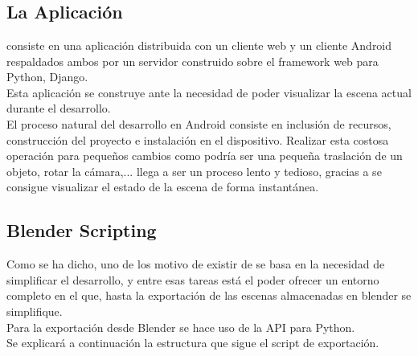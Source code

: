 
\chapter{\studio} %

\label{Chapter3} %



\section{La Aplicación \studio}
\studio consiste en una aplicación distribuida con un cliente web y un cliente Android respaldados ambos por un servidor construido sobre el framework web para Python, Django.\\
Esta aplicación se construye ante la necesidad de poder visualizar la escena actual durante el desarrollo.\\
El proceso natural del desarrollo en Android consiste en inclusión de recursos, construcción del proyecto e instalación en el dispositivo. Realizar esta costosa operación para pequeños cambios como podría ser una pequeña traslación de un objeto, rotar la cámara,... llega a ser un proceso lento y tedioso, gracias a \studio se consigue visualizar el estado de la escena de forma instantánea.

\section{Blender Scripting}
Como se ha dicho, uno de los motivo de existir de \studio se basa en la necesidad de simplificar el desarrollo, y entre esas tareas está el poder ofrecer un entorno completo en el que, hasta la exportación de las escenas almacenadas en blender se simplifique.\\

Para la exportación desde Blender se hace uso de la API para Python.\\
Se explicará a continuación la estructura que sigue el script de exportación.\\

